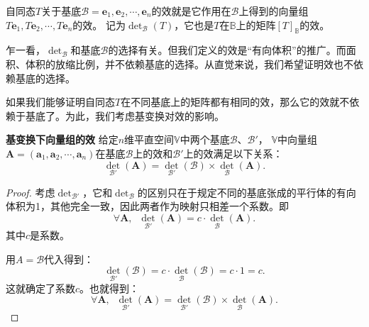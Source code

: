 \documentclass[12pt,UTF8]{ctexbook}
\begin{document}
\begin{df}\label{df:10_4}
自同态$T$关于基底$\mathcal{B} = \mathbf{e}_{1}, \mathbf{e}_{2}, \cdots, \mathbf{e}_{n}$的效就是它作用在$\mathcal{B}$上得到的向量组$T\mathbf{e}_1, T\mathbf{e}_2, \cdots , T\mathbf{e}_n$的效。
记为$\det_\mathcal{B}(T)$，它也是$T$在$\mathbb{B}$上的矩阵$[T]_{\mathbb{B}}$的效。
\end{df}

乍一看，$\det_\mathcal{B}$和基底$\mathcal{B}$的选择有关。但我们定义的效是“有向体积”的推广。而面积、体积的放缩比例，并不依赖基底的选择。从直觉来说，我们希望证明效也不依赖基底的选择。

如果我们能够证明自同态$T$在不同基底上的矩阵都有相同的效，那么它的效就不依赖于基底了。为此，我们考虑基变换对效的影响。
\begin{pp}\textbf{基变换下向量组的效 }\label{pp:10_7}
    给定$n$维平直空间$\mathbb{V}$中两个基底$\mathcal{B}$、$\mathcal{B}'$，
    $\mathbb{V}$中向量组$\mathbf{A} = (\mathbf{a}_1, \mathbf{a}_2, \cdots , \mathbf{a}_n)$在基底$\mathcal{B}$上的效和$\mathcal{B}'$上的效满足以下关系：
    $$ \det_{\mathcal{B}'}(\mathbf{A}) = \det_{\mathcal{B}'}(\mathcal{B}) \times \det_\mathcal{B} (\mathbf{A}). $$
\end{pp}
\begin{proof} %
    考虑$\det_{\mathcal{B}'}$，它和$\det_{\mathcal{B}}$的区别只在于规定不同的基底张成的平行体的有向体积为1，其他完全一致，因此两者作为映射只相差一个系数。即
    $$\forall \mathbf{A},\;\; \det_{\mathcal{B}'}(\mathbf{A}) = c\cdot \det_\mathcal{B} (\mathbf{A}). $$
    其中$c$是系数。

    用$A=\mathcal{B}$代入得到：
    $$ \det_{\mathcal{B}'}(\mathcal{B}) = c \cdot \det_\mathcal{B} (\mathcal{B}) = c\cdot 1 = c. $$
    这就确定了系数$c$。也就得到：
    $$\forall \mathbf{A},\;\;  \det_{\mathcal{B}'}(\mathbf{A}) = \det_{\mathcal{B}'}(\mathcal{B}) \times \det_\mathcal{B} (\mathbf{A}). $$
\end{proof}
\end{document}

